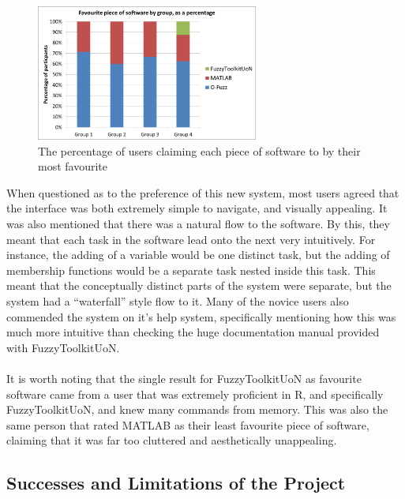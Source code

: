 \begin{figure}[ht!]
	\begin{center}
		\includegraphics[width=0.65\textwidth]{images/mostFav.png}
	\end{center}
	\vspace{-5mm}
	\captionsetup{justification=centering,margin=2cm}	
	\caption{The percentage of users claiming each piece of software to by their most favourite}
	\label{fig:mostLiked}
	\vspace{-2mm}
\end{figure}
\noindent 
When questioned as to the preference of this new system, most users agreed that the interface was both extremely simple to navigate, and visually appealing. It was also mentioned that there was a natural flow to the software. By this, they meant that each task in the software lead onto the next very intuitively. For instance, the adding of a variable would be one distinct task, but the adding of membership functions would be a separate task nested inside this task. This meant that the conceptually distinct parts of the system were separate, but the system had a ``waterfall'' style flow to it. Many of the novice users also commended the system on it's help system, specifically mentioning how this was much more intuitive than checking the huge documentation manual provided with FuzzyToolkitUoN.\ \\
\ \\
It is worth noting that the single result for FuzzyToolkitUoN as favourite software came from a user that was extremely proficient in R, and specifically FuzzyToolkitUoN, and knew many commands from memory. This was also the same person that rated MATLAB as their least favourite piece of software, claiming that it was far too cluttered and aesthetically unappealing.
	

\subsection{Successes and Limitations of the Project}

